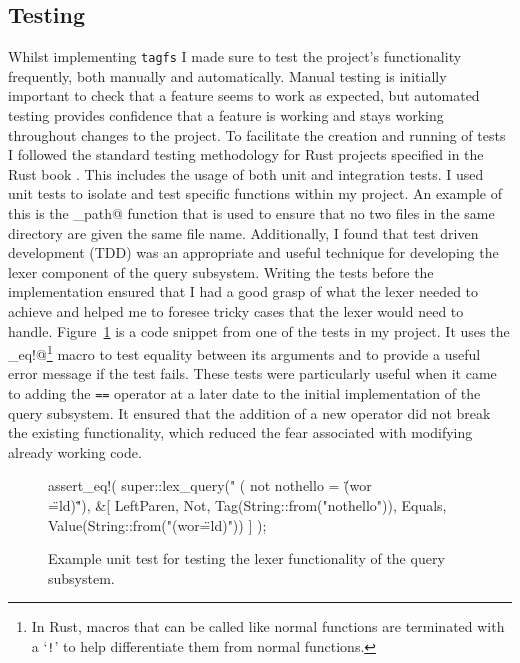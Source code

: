 \subsection{Testing}
\label{sec:testing}


Whilst implementing \texttt{tagfs} I made sure to test the project's
functionality frequently, both manually and automatically. Manual testing is
initially important to check that a feature seems to work as expected, but
automated testing provides confidence that a feature is working and stays
working throughout changes to the project. To facilitate the creation and
running of tests I followed the standard testing methodology for Rust projects
specified in the Rust book \cite{rust-testing}. This includes the usage of both
unit and integration tests. I used unit tests to isolate and test specific
functions within my project. An example of this is the \verb@sanitise_path@
function that is used to ensure that no two files in the same directory are
given the same file name. Additionally, I found that test driven development
(TDD) was an appropriate and useful technique for developing the lexer
component of the query subsystem. Writing the tests before the implementation
ensured that I had a good grasp of what the lexer needed to achieve and helped
me to foresee tricky cases that the lexer would need to handle.
Figure~\ref{fig:example-unit-test} is a code snippet from one of the tests in
my project. It uses the \verb@assert_eq!@\footnote{In Rust, macros that can be
called like normal functions are terminated with a `\texttt{!}' to help
differentiate them from normal functions.} macro to test equality between its
arguments and to provide a useful error message if the test fails. These tests
were particularly useful when it came to adding the \texttt{==} operator at a
later date to the initial implementation of the query subsystem. It ensured
that the addition of a new operator did not break the existing functionality,
which reduced the fear associated with modifying already working code.

\begin{figure}
    \centering
    \begin{boxedverbatim}
assert_eq!(
    super::lex_query("      (     not nothello   = \"(wor\\\"=ld)\""),
    &[
        LeftParen, Not, Tag(String::from("nothello")), Equals,
        Value(String::from("(wor\"=ld)"))
    ]
);
    \end{boxedverbatim}
    \caption[Example unit test]{Example unit test for testing the lexer
        functionality of the query subsystem.}
    \label{fig:example-unit-test}
\end{figure}

